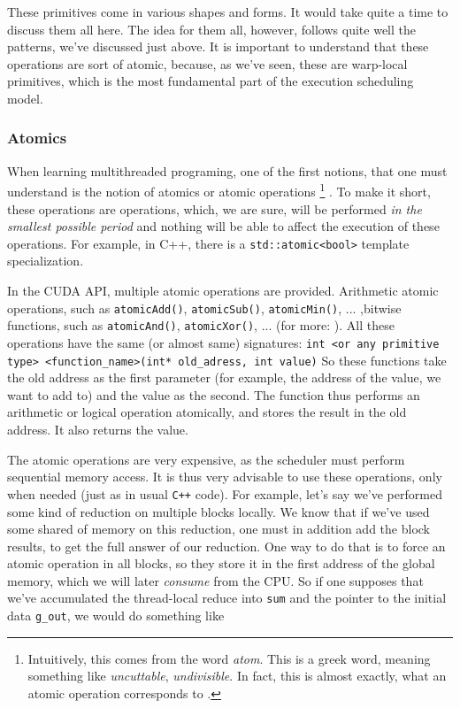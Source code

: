 These primitives come in various shapes and forms. It would take quite a time
to discuss them all here. The idea for them all, however, follows quite well the 
patterns, we've discussed just above. It is important to understand that these operations
are sort of atomic, because, as we've seen, these are warp-local primitives, which is the most 
fundamental part of the execution scheduling model.


\subsubsection*{Atomics}
When learning multithreaded programing, one of the first notions, that one must understand
is the notion of atomics or atomic operations \footnote{Intuitively, 
this comes from the word \textit{atom}. This is a greek word, meaning something 
like \textit{uncuttable}, \textit{undivisible}. In fact, this is almost exactly, what an atomic operation corresponds to 
\cite{atomics} .}
. To make it short, these operations are operations, which, we are sure, will be performed \textit{in the smallest possible
period} and nothing will be able to affect the execution of these operations.
For example, in C++, there is a \verb|std::atomic<bool>| template specialization. 


In the CUDA API, multiple atomic operations are provided. Arithmetic atomic operations, 
such as \verb|atomicAdd()|, \verb|atomicSub()|, \verb|atomicMin()|, ... 
,bitwise functions, such as \verb|atomicAnd()|, \verb|atomicXor()|, ...
(for more: \cite{center}).
All these operations have the same (or almost same) signatures: 
\verb|int <or any primitive type> <function_name>(int* old_adress, int value)|
So these functions take the old address as the first parameter (for example, the address of the value, we want to add to) and 
the value as the second. The function thus performs an arithmetic or logical operation atomically, 
and stores the result in the old address. It also returns the value.


The atomic operations are very expensive, as the scheduler must perform sequential memory access. 
It is thus very advisable to use these operations, only when needed (just as in usual \verb|C++| code).
For example, let's say we've performed some kind of reduction on multiple blocks locally. 
We know that if we've used some shared of memory on this reduction, one must in addition add the block results, to 
get the full answer of our reduction. One way to do that is to force an atomic operation in all blocks, so they store it 
in the first address of the global memory, which we will later \textit{consume} from the CPU. 
So if one  supposes that we've accumulated the thread-local reduce into \verb|sum| and the pointer to the 
initial data \verb|g_out|, we would do something like

